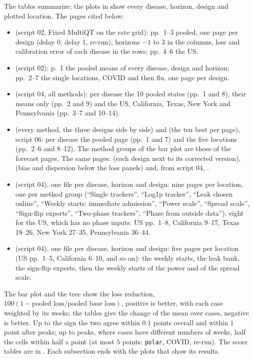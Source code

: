 \documentclass[11pt,a4paper]{article}
\theoremstyle{definition}
\theoremstyle{remark}
\begin{document}
The tables summarize; the plots in  show every disease,
horizon, design and plotted location. The pages cited below:
\begin{itemize}[leftmargin=*,itemsep=1pt]
\item {} (script 02, Fixed MultiQT on
the rate grid): pp.~1--3 pooled, one page per design (delay 0, delay 1,
re-run), horizons $-1$ to $3$ in the columns, loss and calibration error
of each disease in the rows; pp.~4--6 the US.
\item {} (script 02): p.~1 the pooled means
of every disease, design and horizon; pp.~2--7 the single locations,
COVID and then flu, one page per design.
\item {} (script 04, all methods):
per disease the 10 pooled states (pp.~1 and 8), their means only (pp.~2
and 9) and the US, California, Texas, New York and Pennsylvania (pp.~3--7
and 10--14).
\item {} (every method, the three designs side
by side) and  (the ten best per page),
script 06: per disease the pooled page (pp.~1 and 7) and the five
locations (pp.~2--6 and 8--12). The method groups of the bar plot are
those of the forecast pages. The same pages:
 (each design next to its
corrected version),  (bias and
dispersion below the loss panels) and, from script 04,
.
\item {} (script 04), one file per disease,
horizon and design: nine pages per location, one per method group
(``Single trackers'', ``Log1p tracker'', ``Leak chosen online'',
``Weekly starts: immediate admission'', ``Power scale'', ``Spread scale'',
``Sign-flip experts'', ``Two-phase trackers'', ``Phase from outside
data''), eight for the US, which has no phase inputs: US pp.~1--8,
California 9--17, Texas 18--26, New York 27--35, Pennsylvania 36--44.
\item {} (script 04), one file per disease,
horizon and design: five pages per location (US pp.~1--5, California
6--10, and so on): the weekly starts, the leak bank, the sign-flip experts,
then the weekly starts of the power and of the spread scale.
\end{itemize}
The bar plot and the tree
show the loss reduction, $100(1-\text{pooled loss}/\text{pooled base
loss})$, positive is better, with each case weighted by its weeks; the
tables give the change of the mean over cases, negative is better. Up to
the sign the two agree within $0.1$ points overall and within $1$ point
after peaks; up to peaks, where cases have different numbers of weeks,
half the cells within half a point (at most $5$ points: \texttt{polar},
COVID, re-run).
The score tables are in
. Each subsection ends with the plots
that show its results.
\end{document}
